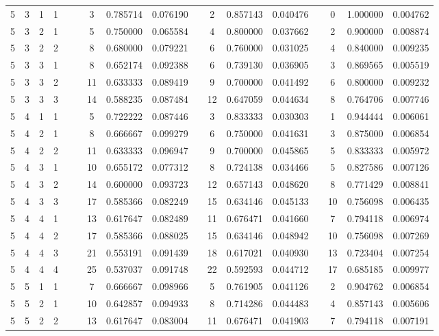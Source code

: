\begin{appendix}
\begin{longtable}[h]{rrrcccccccccccccc}
5	&	3	&	1	&	1	&&&	3	&	0.785714	&	0.076190	&&	2	&	0.857143	&	0.040476	&&	0	&	1.000000	&	0.004762	\\
5	&	3	&	2	&	1	&&&	5	&	0.750000	&	0.065584	&&	4	&	0.800000	&	0.037662	&&	2	&	0.900000	&	0.008874	\\
5	&	3	&	2	&	2	&&&	8	&	0.680000	&	0.079221	&&	6	&	0.760000	&	0.031025	&&	4	&	0.840000	&	0.009235	\\
5	&	3	&	3	&	1	&&&	8	&	0.652174	&	0.092388	&&	6	&	0.739130	&	0.036905	&&	3	&	0.869565	&	0.005519	\\
5	&	3	&	3	&	2	&&&	11	&	0.633333	&	0.089419	&&	9	&	0.700000	&	0.041492	&&	6	&	0.800000	&	0.009232	\\
5	&	3	&	3	&	3	&&&	14	&	0.588235	&	0.087484	&&	12	&	0.647059	&	0.044634	&&	8	&	0.764706	&	0.007746	\\
5	&	4	&	1	&	1	&&&	5	&	0.722222	&	0.087446	&&	3	&	0.833333	&	0.030303	&&	1	&	0.944444	&	0.006061	\\
5	&	4	&	2	&	1	&&&	8	&	0.666667	&	0.099279	&&	6	&	0.750000	&	0.041631	&&	3	&	0.875000	&	0.006854	\\
5	&	4	&	2	&	2	&&&	11	&	0.633333	&	0.096947	&&	9	&	0.700000	&	0.045865	&&	5	&	0.833333	&	0.005972	\\
5	&	4	&	3	&	1	&&&	10	&	0.655172	&	0.077312	&&	8	&	0.724138	&	0.034466	&&	5	&	0.827586	&	0.007126	\\
5	&	4	&	3	&	2	&&&	14	&	0.600000	&	0.093723	&&	12	&	0.657143	&	0.048620	&&	8	&	0.771429	&	0.008841	\\
5	&	4	&	3	&	3	&&&	17	&	0.585366	&	0.082249	&&	15	&	0.634146	&	0.045133	&&	10	&	0.756098	&	0.006435	\\
5	&	4	&	4	&	1	&&&	13	&	0.617647	&	0.082489	&&	11	&	0.676471	&	0.041660	&&	7	&	0.794118	&	0.006974	\\
5	&	4	&	4	&	2	&&&	17	&	0.585366	&	0.088025	&&	15	&	0.634146	&	0.048942	&&	10	&	0.756098	&	0.007269	\\
5	&	4	&	4	&	3	&&&	21	&	0.553191	&	0.091439	&&	18	&	0.617021	&	0.040930	&&	13	&	0.723404	&	0.007254	\\
5	&	4	&	4	&	4	&&&	25	&	0.537037	&	0.091748	&&	22	&	0.592593	&	0.044712	&&	17	&	0.685185	&	0.009977	\\
5	&	5	&	1	&	1	&&&	7	&	0.666667	&	0.098966	&&	5	&	0.761905	&	0.041126	&&	2	&	0.904762	&	0.006854	\\
5	&	5	&	2	&	1	&&&	10	&	0.642857	&	0.094933	&&	8	&	0.714286	&	0.044483	&&	4	&	0.857143	&	0.005606	\\
5	&	5	&	2	&	2	&&&	13	&	0.617647	&	0.083004	&&	11	&	0.676471	&	0.041903	&&	7	&	0.794118	&	0.007191	\\

\end{longtable}
\end{appendix}
